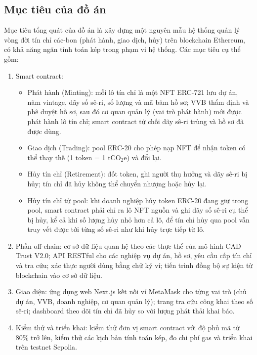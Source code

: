 \subsection*{Mục tiêu của đồ án}
\label{subsec:muctieu}
Mục tiêu tổng quát của đồ án là xây dựng một nguyên mẫu hệ thống quản lý vòng đời tín chỉ các-bon (phát hành, giao dịch, hủy) trên blockchain Ethereum, có khả năng ngăn tính toán kép trong phạm vi hệ thống. Các mục tiêu cụ thể gồm:
\begin{enumerate}
    \item Smart contract:
    \begin{itemize}
        \item Phát hành (Minting): mỗi lô tín chỉ là một NFT ERC-721 lưu dự án, năm vintage, dãy số sê-ri, số lượng và mã băm hồ sơ; VVB thẩm định và phê duyệt hồ sơ, sau đó cơ quan quản lý (vai trò phát hành) mới được phát hành lô tín chỉ; smart contract từ chối dãy sê-ri trùng và hồ sơ đã được dùng.
        \item Giao dịch (Trading): pool ERC-20 cho phép nạp NFT để nhận token có thể thay thế (1 token = 1 tCO$_2$e) và đổi lại.
        \item Hủy tín chỉ (Retirement): đốt token, ghi người thụ hưởng và dãy sê-ri bị hủy; tín chỉ đã hủy không thể chuyển nhượng hoặc hủy lại.
        \item Hủy tín chỉ từ pool: khi doanh nghiệp hủy token ERC-20 đang giữ trong pool, smart contract phải chỉ ra lô NFT nguồn và ghi dãy số sê-ri cụ thể bị hủy, kể cả khi số lượng hủy nhỏ hơn cả lô, để tín chỉ hủy qua pool vẫn truy vết được tới từng số sê-ri như khi hủy trực tiếp từ lô.
    \end{itemize}
    \item Phần off-chain: cơ sở dữ liệu quan hệ theo các thực thể của mô hình CAD Trust V2.0; API RESTful cho các nghiệp vụ dự án, hồ sơ, yêu cầu cấp tín chỉ và tra cứu; xác thực người dùng bằng chữ ký ví; tiến trình đồng bộ sự kiện từ blockchain vào cơ sở dữ liệu.
    \item Giao diện: ứng dụng web Next.js kết nối ví MetaMask cho từng vai trò (chủ dự án, VVB, doanh nghiệp, cơ quan quản lý); trang tra cứu công khai theo số sê-ri; dashboard theo dõi tín chỉ đã hủy so với lượng phát thải khai báo.
    \item Kiểm thử và triển khai: kiểm thử đơn vị smart contract với độ phủ mã từ 80\% trở lên, kiểm thử các kịch bản tính toán kép, đo chi phí gas và triển khai trên testnet Sepolia.
\end{enumerate}

